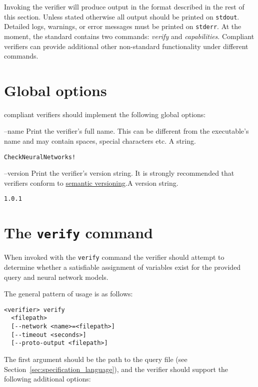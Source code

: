 Invoking the verifier will produce output in the format described in the rest of this section. Unless stated otherwise all output should be printed on \texttt{stdout}. Detailed logs, warnings, or error messages must be printed on \texttt{stderr}.
At the moment, the \vnnlib{} standard contains two commands: \emph{verify} and \emph{capabilities}. Compliant verifiers can provide additional other non-standard functionality under different commands. 

\section{Global options}

\vnnlib{} compliant verifiers should implement the following global options:

\clOutputOption
{--name}
{Print the verifier's full name. This can be different from the executable's name and may contain spaces, special characters etc.}
{A string.}
\begin{lstlisting}[style=bash]
%*\exampleVerifier* --name
CheckNeuralNetworks!
\end{lstlisting}

\clOutputOption
{--version}
{Print the verifier's version string. It is strongly recommended that verifiers conform to \href{https://semver.org/}{semantic versioning}.}{A version string.}
\begin{lstlisting}[style=bash]
%*\exampleVerifier* --version
1.0.1
\end{lstlisting}


\section{The \texttt{verify} command}
\label{sec:verify_command}

When invoked with the \texttt{verify} command  the verifier should attempt to determine whether a satisfiable assignment of variables exist for the provided \vnnlib{} query and neural network models.

The general pattern of usage is as follows:
\begin{lstlisting}[style=bash]
<verifier> verify 
  <filepath>
  [--network <name>=<filepath>]
  [--timeout <seconds>]
  [--proto-output <filepath>]
\end{lstlisting}
The first argument should be the path to the \vnnlib{} query file (see Section~\ref{sec:specification_language}), and the verifier should support the following additional options:

